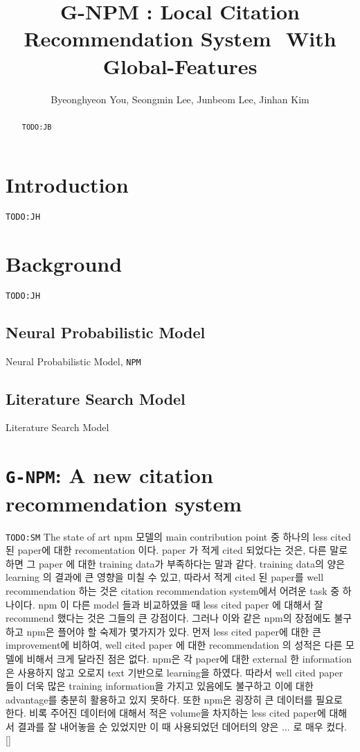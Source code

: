 \documentclass{llncs}
\newcommand{\name}{\texttt{G-NPM}\xspace}
\newcommand{\npm}{\texttt{NPM}\xspace}
\newcommand{\todo}[1]{\texttt{\color{red}TODO:#1}}
\begin{document}
\title{G-NPM : Local Citation Recommendation System  With Global-Features}

\author{Byeonghyeon You, Seongmin Lee, Junbeom Lee, Jinhan Kim}


\maketitle

\begin{abstract}
\todo{JB}

\end{abstract}

\section{Introduction}
\label{sec:introduction}
\todo{JH}

\section{Background}
\todo{JH}
\subsection{Neural Probabilistic Model}
Neural Probabilistic Model, \npm ~\cite{Huang:2015:NPM:2886521.2886655}
\subsection{Literature Search Model}
Literature Search Model~\cite{Bethard:2010:ICL:1871437.1871517}

\section{\name: A new citation recommendation system}
\todo{SM}
The state of art npm 모델의 main contribution point 중 하나의 less cited 된 paper에 대한 recomentation 이다. paper 가 적게 cited 되었다는 것은, 다른 말로 하면 그 paper 에 대한 training data가 부족하다는 말과 같다. training data의 양은 learning 의 결과에 큰 영향을 미칠 수 있고, 따라서 적게 cited 된 paper를 well recommendation 하는 것은 citation recommendation system에서 어려운 task 중 하나이다. npm 이 다른 model 들과 비교하였을 때 less cited paper 에 대해서 잘 recommend 했다는 것은 그들의 큰 강점이다.
그러나 이와 같은 npm의 장점에도 불구하고 npm은 플어야 할 숙제가 몇가지가 있다. 먼저 less cited paper에 대한 큰 improvement에 비하여, well cited paper 에 대한 recommendation 의 성적은 다른 모델에 비해서 크게 달라진 점은 없다. npm은 각 paper에 대한 external 한 information 은 사용하지 않고 오로지 text 기반으로 learning을 하였다. 따라서 well cited paper 들이 더욱 많은 training information을 가지고 있음에도 불구하고 이에 대한 advantage를 충분히 활용하고 있지 못하다. 또한 npm은 굉장히 큰 데이터를 필요로 한다. 비록 주어진 데이터에 대해서 적은 volume을 차지하는 less cited paper에 대해서 결과를 잘 내어놓을 순 있었지만 이 때 사용되었던 데어터의 양은 ... 로 매우 컸다.
[]
\end{document}
